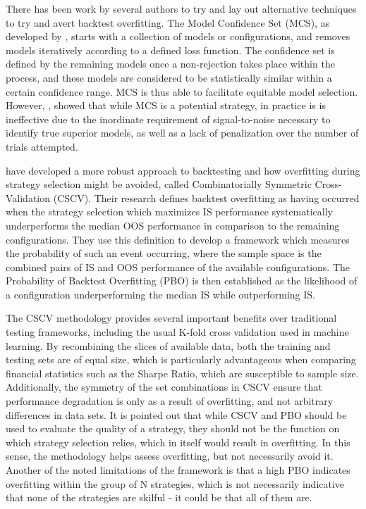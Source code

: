 \documentclass[a4paper,11pt,oneside]{article}
\theoremstyle{plain}
\theoremstyle{definition}
\begin{document}
	There has been work by several authors to try and lay out alternative techniques to try and avert backtest overfitting. 
	The Model Confidence Set (MCS), as developed by \citet{Hansen}, starts with a 
	collection of models or configurations, and removes models iteratively according to a defined loss function. 
	The confidence set is defined by the remaining models once a non-rejection takes place within the process, and 
	these models are considered to be statistically similar within a certain confidence range. MCS is thus able to facilitate 
	equitable model selection. However, \citet{Aparicio}, showed that while MCS is a potential strategy, in 
	practice is is ineffective due to the inordinate requirement of signal-to-noise necessary to identify true superior 
	models, as well as a lack of penalization over the number of trials attempted.
	\hfill \break
	
	\citet{BailyPBO} have developed a more robust approach to backtesting and how overfitting during strategy 
	selection might be avoided, called Combinatorially Symmetric Cross-Validation (CSCV). Their research defines backtest overfitting as having occurred when the strategy selection which maximizes IS performance systematically underperforms the median OOS performance in comparison to the remaining configurations. They use this definition to develop a framework which measures the probability of such an event occurring, where the sample space is the combined pairs of IS and OOS performance of the available configurations. The Probability of Backtest Overfitting (PBO) is then established as the likelihood of a configuration underperforming the median IS while outperforming IS. 
	\hfill \break 
	
	The CSCV methodology provides several important benefits over traditional testing 
	frameworks, including the usual K-fold cross validation used in machine learning. By recombining the slices of 
	available data, both the training and testing sets are of equal size, which is particularly advantageous when comparing 
	financial statistics such as the Sharpe Ratio, which are susceptible to sample size. Additionally, the symmetry 
	of the set combinations in CSCV ensure that performance degradation is only as a result of overfitting, and not 
	arbitrary differences in data sets. It is pointed out that while CSCV and PBO should be used to evaluate the quality 
	of a strategy, they should not be the function on which strategy selection relies, which in itself would result in overfitting. In this sense, the methodology helps assess overfitting, but not necessarily avoid it. Another of the noted limitations of the framework is 
	that a high PBO indicates overfitting within the group of N strategies, which is not necessarily indicative that none 
	of the strategies are skilful - it could be that all of them are. 
	\hfill \break 
	
\end{document}
